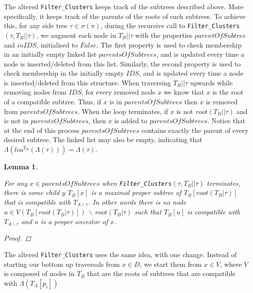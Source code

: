 \documentclass{article}
\newcommand{\leafset}{\Lambda}
\newtheorem{filterclustersremovednodemaximalsubtree}[incompatibility]{Lemma}
\begin{document}
    The altered \texttt{Filter\_Clusters} keeps track of the subtrees described above. More specifically, it keeps track of the parents of the roots of such subtrees. To achieve this, for any side tree $\tau \in \sigma(\pi)$, during the recursive call to \texttt{Filter\_Clusters}$(\tau, T_B||\tau)$, we augment each node in $T_B||\tau$ with the properties $parentOfSubtree$ and $inIDS$, initialised to $False$. The first property is used to check membership in an initially empty linked list $parentsOfSubtrees$, and is updated every time a node is inserted/deleted from this list. Similarly, the second property is used to check membership in the initially empty $IDS$, and is updated every time a node is inserted/deleted from this structure. When traversing $T_B||\tau$ upwards while removing nodes from $IDS$, for every removed node $x$ we know that $x$ is the root of a compatible subtree. Thus, if $x$ is in $parentsOfSubtrees$ then $x$ is removed from $parentsOfSubtrees$. When the loop terminates, if $x$ is not $root(T_B||\tau)$ and is not in $parentsOfSubtrees$, then $x$ is added to $parentsOfSubtrees$. Notice that at the end of this process $parentsOfSubtrees$ contains exactly the parent of every desired subtree. The linked list may also be empty, indicating that $\Lambda(lca^{T_B}(\Lambda(\tau))) = \Lambda(\tau)$.\\

    \begin{filterclustersremovednodemaximalsubtree}
        \label{lem:filterclustersremovednodemaximalsubtree}

        For any $x \in parentsOfSubtrees$ when \texttt{Filter\_Clusters}$(\tau, T_B||\tau)$ terminates, there is some child $y$ $T_B[x]$ is a maximal proper subtree of $T_B[root(T_B|\tau)]$ that is compatible with $T_{A \backslash \tau}$. In other words there is no node $u \in V(T_B[root(T_B|\tau)])\, \backslash\, root(T_B|\tau)$ such that $T_B[u]$ is compatible with $T_{A \backslash \tau}$ and $u$ is a proper ancestor of $x$.

        \begin{proof}

        \end{proof}
    \end{filterclustersremovednodemaximalsubtree}

    The altered \texttt{Filter\_Clusters} uses the same idea, with one change. Instead of starting our bottom up traversals from $x \in D$, we start them from $x \in V$, where $V$ is composed of nodes in $T_B$ that are the roots of subtrees that are compatible with $\leafset(T_A[p_i])$
\end{document}
